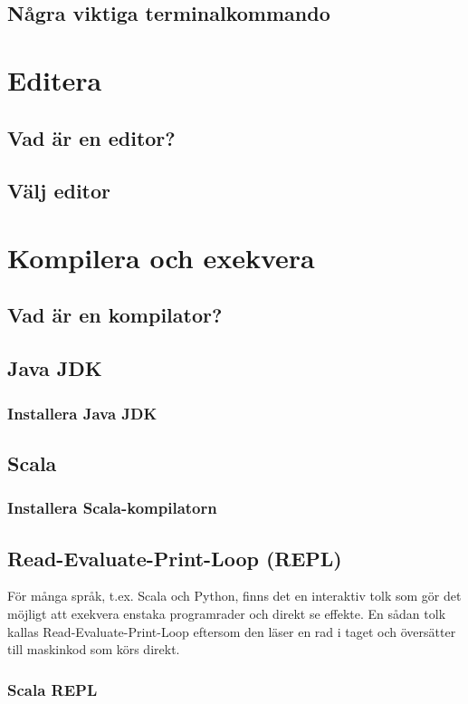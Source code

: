 \documentclass[a4paper]{compendium}
\begin{document}
\section{Några viktiga terminalkommando}

\chapter{Editera}
\section{Vad är en editor?}
\section{Välj editor}

\chapter{Kompilera och exekvera}
\section{Vad är en kompilator?}
\section{Java JDK}
\subsection{Installera Java JDK}
\section{Scala}
\subsection{Installera Scala-kompilatorn}
\section{Read-Evaluate-Print-Loop (REPL)}
För många språk, t.ex. Scala och Python, finns det en interaktiv tolk som gör det möjligt att exekvera enstaka programrader och direkt se effekte. En sådan tolk kallas Read-Evaluate-Print-Loop eftersom den läser en rad i taget och översätter till maskinkod som körs direkt.    
\subsection{Scala REPL}
\end{document}
